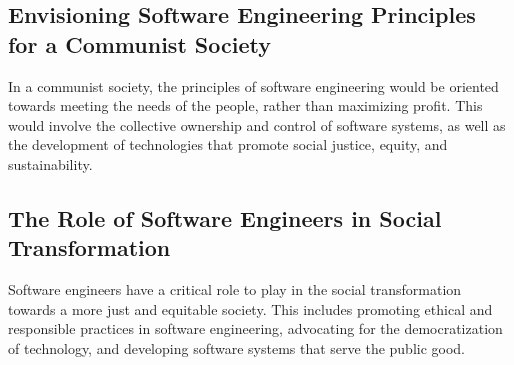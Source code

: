\begin{refsection}
\begin{multicols}{2}
{\subsection{Envisioning Software Engineering Principles for a Communist Society}

In a communist society, the principles of software engineering would be oriented towards meeting the needs of the people, rather than maximizing profit. This would involve the collective ownership and control of software systems, as well as the development of technologies that promote social justice, equity, and sustainability.

\subsection{The Role of Software Engineers in Social Transformation}

Software engineers have a critical role to play in the social transformation towards a more just and equitable society. This includes promoting ethical and responsible practices in software engineering, advocating for the democratization of technology, and developing software systems that serve the public good.

}
\end{multicols}

\printbibliography[heading=subbibliography]
\end{refsection}

